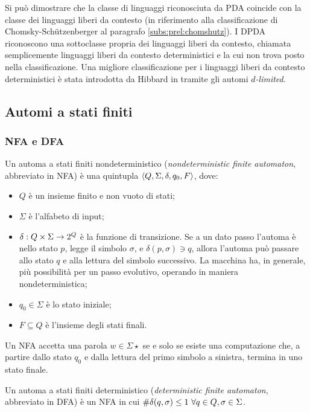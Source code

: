 Si può dimostrare che la classe di linguaggi riconosciuta da PDA coincide con la classe dei linguaggi liberi da contesto (in riferimento alla classificazione di Chomsky-Schützenberger al paragrafo \ref{subs:prel:chomshutz}). I DPDA riconoscono una sottoclasse propria dei linguaggi liberi da contesto, chiamata semplicemente linguaggi liberi da contesto deterministici e la cui non trova posto nella classificazione. Una migliore classificazione per i linguaggi liberi da contesto deterministici è stata introdotta da Hibbard in \cite{hibbard67} tramite gli automi \emph{$d$-limited}.


\subsection{Automi a stati finiti}

\subsubsection{NFA e DFA}
\begin{defin}
	Un automa a stati finiti nondeterministico (\emph{nondeterministic finite automaton}, abbreviato in NFA) è una quintupla $\langle Q,\Sigma,\delta,q_0,F \rangle$, dove:
	\begin{itemize}
		\item $Q$ è un insieme finito e non vuoto di stati;
		\item $\Sigma$ è l'alfabeto di input;
		\item $\delta:Q\times\Sigma\to2^{Q}$ è la funzione di transizione. Se a un dato passo l'automa è nello stato $p$, legge il simbolo $\sigma$, e $\delta(p,\sigma)\ni q$, allora l'automa può passare allo stato $q$ e alla lettura del simbolo successivo. La macchina ha, in generale, più possibilità per un passo evolutivo, operando in maniera nondeterministica;
		\item $q_0\in\Sigma$ è lo stato iniziale;
		\item $F\subseteq Q$ è l'insieme degli stati finali.
	\end{itemize}
	Un NFA accetta una parola $w\in\Sigma\star$ se e solo se esiste una computazione che, a partire dallo stato $q_0$ e dalla lettura del primo simbolo a sinistra, termina in uno stato finale.
\end{defin}
\begin{defin}
	Un automa a stati finiti deterministico (\emph{deterministic finite automaton}, abbreviato in DFA) è un NFA in cui $\# \delta(q,\sigma)\leq 1 ~ \forall q\in Q,\sigma\in\Sigma$.
\end{defin}

